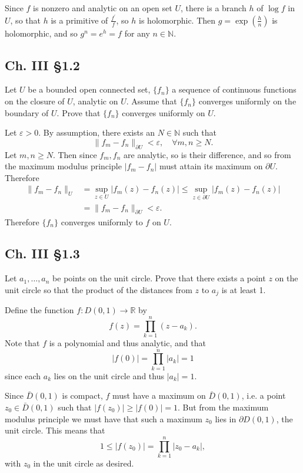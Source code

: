 \documentclass{article}
\newcommand\horline{\noindent\makebox[\linewidth]{\rule{\textwidth}{0.4pt}}}
\begin{document}
\horline

Since $f$ is nonzero and analytic on an open set $U$, there is a
branch $h$ of $\log f$ in $U$, so that $h$ is a primitive of
$\frac{f^\prime}{f}$, so $h$ is holomorphic. Then
$g = \exp\left(\frac{h}{n}\right)$ is holomorphic, and so
$g^n = e^h = f$ for any $n \in \mathbb{N}$.

\subsection*{Ch. III \S 1.2}
Let $U$ be a bounded open connected set, $\{f_n\}$ a sequence of
continuous functions on the closure of $U$, analytic on $U$. Assume
that $\{f_n\}$ converges uniformly on the boundary of $U$. Prove that
$\{f_n\}$ converges uniformly on $U$.

\horline

Let $\varepsilon > 0$.
By assumption, there exists an $N \in \mathbb{N}$ such that
$$
\| f_m - f_n \|_{\partial U} < \varepsilon, \quad
\forall m, n \geq N.
$$
Let $m, n \geq N$. Then since $f_m, f_n$ are analytic, so is their difference, and so from
the maximum modulus principle $|f_m - f_n|$ must attain its maximum on
$\partial U$. Therefore
\begin{align*}
     \| f_m - f_n \|_U
&=    \sup_{z \in U} |f_m(z) - f_n(z)|
 \leq \sup_{z \in \partial U} |f_m(z) - f_n(z)| \\
&=    \| f_m - f_n \|_{\partial U}
 <    \varepsilon.
\end{align*}
Therefore $\{ f_n \}$ converges uniformly to $f$ on $U$.

\subsection*{Ch. III \S 1.3}
Let $a_1, \dots, a_n$ be points on the unit circle. Prove that there
exists a point $z$ on the unit circle so that the product of the
distances from $z$ to $a_j$ is at least 1.

\horline

Define the function $f : D(0, 1) \to \mathbb{R}$ by
$$
f(z) = \prod_{k=1}^n (z - a_k).
$$
Note that $f$ is a polynomial and thus analytic, and that
$$
|f(0)| = \prod_{k=1}^n |a_k| = 1
$$
since each $a_k$ lies on the unit circle and thus $|a_k| = 1$.

Since $\bar{D}(0, 1)$ is compact, $f$ must have a maximum
on $\bar{D}(0, 1)$, i.e. a point $z_0 \in \bar{D}(0,1)$
such that $|f(z_0)| \geq |f(0)| = 1$. But from the maximum modulus
principle we must have that such a maximum
$z_0$ lies in $\partial D(0, 1)$, the unit circle. This means that
$$
1 \leq |f(z_0)| = \prod_{k=1}^n |z_0 - a_k|,
$$
with $z_0$ in the unit circle as desired.
\end{document}
